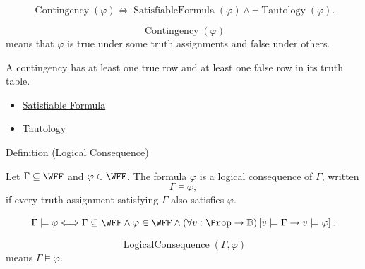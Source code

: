 \begin{remark*}
\[
\operatorname{Contingency}(\varphi)
\Longleftrightarrow
\operatorname{SatisfiableFormula}(\varphi)
\land
\neg \operatorname{Tautology}(\varphi).
\]
\end{remark*}

\begin{remark*}
\[
\operatorname{Contingency}(\varphi)
\]
means that \(\varphi\) is true under some truth assignments and false under others.
\end{remark*}

\begin{remark*}[Interpretation]
A contingency has at least one true row and at least one false row in its truth table.
\end{remark*}

\begin{dependencies}
\begin{itemize}
  \item \hyperref[def:satisfiable-formula-propositional-logic]{Satisfiable Formula}
  \item \hyperref[def:tautology-propositional-logic]{Tautology}
\end{itemize}
\end{dependencies}
\begin{definitionbox}{Definition (Logical Consequence)}
\begin{definition}
\label{def:logical-consequence-propositional-logic}
Let \(\Gamma\subseteq\WFF\) and \(\varphi\in\WFF\). The formula \(\varphi\) is a logical consequence of \(\Gamma\), written
\[
\Gamma\models\varphi,
\]
if every truth assignment satisfying \(\Gamma\) also satisfies \(\varphi\).
\end{definition}
\end{definitionbox}

\begin{remark*}
\[
\Gamma\models\varphi
\Longleftrightarrow
\Gamma\subseteq\WFF
\land
\varphi\in\WFF
\land
(\forall v:\Prop\to\mathbb{B})
\left[
v\models\Gamma\to v\models\varphi
\right].
\]
\end{remark*}

\begin{remark*}
\[
\operatorname{LogicalConsequence}(\Gamma,\varphi)
\]
means \(\Gamma\models\varphi\).
\end{remark*}

